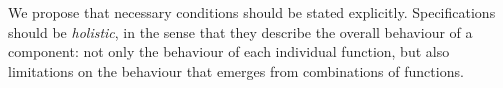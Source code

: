  We propose that  necessary conditions should be stated
 explicitly. Specifications should be \emph{holistic}, in the sense
 that they describe the  overall behaviour of a component: not only the
 behaviour of each individual function, but also limitations on the
 behaviour that emerges from combinations of functions.
%
%
 
